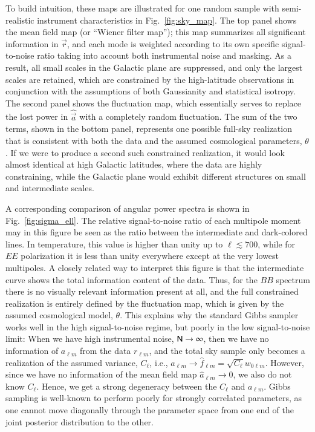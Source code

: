 \documentclass[twocolumn]{../common/aa}
\renewcommand{\a}[0]{\vec{a}}
\newcommand{\N}[0]{\tens{N}}
\renewcommand{\r}[0]{\vec{r}}
\begin{document}
To build intuition, these maps are illustrated for one random sample with semi-realistic instrument characteristics in Fig.~\ref{fig:sky_map}. The top panel shows the mean field map (or ``Wiener filter map''); this map summarizes all significant information in $\r$, and each mode is weighted according to its own specific signal-to-noise ratio taking into account both instrumental noise and masking. As a result, all small scales in the Galactic plane are suppressed, and only the largest scales are retained, which are constrained by the high-latitude observations in conjunction with the assumptions of both Gaussianity and statistical isotropy. The second panel shows the fluctuation map, which essentially serves to replace the lost power in $\hat{\a}$ with a completely random fluctuation. The sum of the two terms, shown in the bottom panel, represents one possible full-sky realization that is consistent with both the data and the assumed cosmological parameters, $\theta$. If we were to produce a second such constrained realization, it would look almost identical at high Galactic latitudes, where the data are highly constraining, while the Galactic plane would exhibit different structures on small and intermediate scales.

A corresponding comparison of angular power spectra is shown in Fig.~\ref{fig:sigma_ell}. The relative signal-to-noise ratio of each multipole moment may in this figure be seen as the ratio between the intermediate and dark-colored lines. In temperature, this value is higher than unity up to $\ell\lesssim700$, while for $EE$ polarization it is less than unity everywhere except at the very lowest multipoles. A closely related way to interpret this figure is that the intermediate curve shows the total information content of the data. Thus, for the $BB$ spectrum there is no visually relevant information present at all, and the full constrained realization is entirely defined by the fluctuation map, which is given by the assumed cosmological model, $\theta$. This explains why the standard Gibbs sampler works well in the high signal-to-noise regime, but poorly in the low signal-to-noise limit: When we have high instrumental noise, $\N \rightarrow \infty$, then we have no information of $a_{\ell m}$ from the data $r_{\ell m}$, and the total sky sample only becomes a realization of the assumed variance, $C_{\ell}$, i.e., $a_{\ell m} \rightarrow \hat{f}_{\ell m} = \sqrt{C_{\ell}} w_{0\ell m}$. However, since we have no information of the mean field map $\hat{a}_{\ell m} \rightarrow 0$, we also do not know $C_\ell$. Hence, we get a strong degeneracy between the $C_\ell$ and $a_{\ell m}$. Gibbs sampling is well-known to perform poorly for strongly correlated parameters, as one cannot move diagonally through the parameter space from one end of the joint posterior distribution to the other. 
\end{document}
